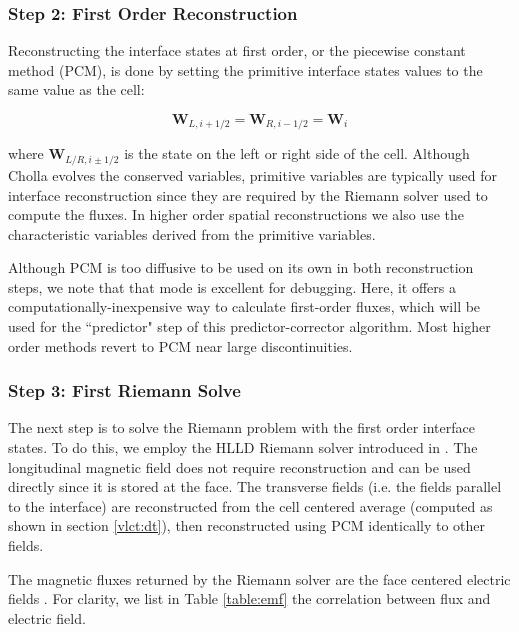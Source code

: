 \subsubsection{Step 2: First Order Reconstruction}
\label{vlct:first-order-reconstruction}

Reconstructing the interface states at first order, or the piecewise constant method (PCM), is done by setting the primitive interface states values to the same value as the cell:

\begin{equation}
    \boldsymbol{W}_{L, i+1/2} = \boldsymbol{W}_{R, i-1/2} = \boldsymbol{W}_{i}
\end{equation}

\noindent where $ \boldsymbol{W}_{L/R, i\pm1/2} $ is the state on the left or right side of the cell. Although Cholla evolves the conserved variables, primitive variables are typically used for interface reconstruction since they are required by the Riemann solver used to compute the fluxes. In higher order spatial reconstructions we also use the characteristic variables derived from the primitive variables.

Although PCM is too diffusive to be used on its own in both reconstruction steps, we note that that mode is excellent for debugging. Here, it offers a computationally-inexpensive way to calculate first-order fluxes, which will be used for the ``predictor" step of this predictor-corrector algorithm. Most higher order methods revert to PCM near large discontinuities.

\subsubsection{Step 3: First Riemann Solve}
\label{vlct:first-riemann-solve}

The next step is to solve the Riemann problem with the first order interface states. To do this, we employ the HLLD Riemann solver introduced in \cite{hlld_2005}. The longitudinal magnetic field does not require reconstruction and can be used directly since it is stored at the face. The transverse fields (i.e. the fields parallel to the interface) are reconstructed from the cell centered average (computed as shown in section \ref{vlct:dt}), then reconstructed using PCM identically to other fields.

The magnetic fluxes returned by the Riemann solver are the face centered electric fields \citep[see section 5.3 of][]{stone_athena_2008}. For clarity, we list in Table \ref{table:emf} the correlation between flux and electric field.


